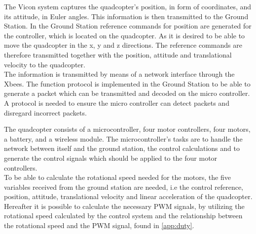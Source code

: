 The Vicon system captures the quadcopter's position, in form of coordinates, and its attitude, in Euler angles. This information is then transmitted to the Ground Station. In the Ground Station reference commands for position are generated for the controller, which is located on the quadcopter. As it is desired to be able to move the quadcopter in the x, y and z directions. The reference commands are therefore transmitted together with the position, attitude and translational velocity to the quadcopter. \\ The information is transmitted by means of a network interface through the Xbees. The function protocol is implemented in the Ground Station to be able to generate a packet which can be transmitted and decoded on the micro controller. A protocol is needed to ensure the micro controller can detect packets and disregard incorrect packets.

The quadcopter consists of a microcontroller, four motor controllers, four motors, a battery, and a wireless module. The microcontroller's tasks are to handle the network between itself and the ground station, the control calculations and to generate the control signals which should be applied to the four motor controllers. \\
To be able to calculate the rotational speed needed for the motors, the five variables received from the ground station are needed, i.e the control reference, position, attitude, translational velocity and linear acceleration of the quadcopter. Hereafter it is possible to calculate the necessary PWM signals, by utilizing the rotational speed calculated by the control system and the relationship between the rotational speed and the PWM signal, found in \autoref{app:duty}.



